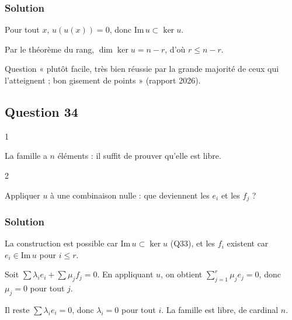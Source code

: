 \documentclass[11pt,a4paper]{article}
\newcommand{\equationajustee}[1]{%
  \sbox{\boiteequation}{$\displaystyle #1$}%
  \ifdim\wd\boiteequation>\linewidth
    \[\resizebox{\linewidth}{!}{\usebox{\boiteequation}}\]%
  \else
    \[#1\]%
  \fi}
\begin{document}
\hypertarget{solution-32}{%
\subsubsection{Solution}\label{solution-32}}

Pour tout \(x\), \(u(u(x))=0\), donc \(\mathrm{Im}\,u\subset\ker u\).

Par le théorème du rang, \(\dim\ker u=n-r\), d'où \(r\le n-r\).

\equationajustee{\boxed{\mathrm{Im}\,u\subset\ker u\ \text{ et }\ r\le n-r.}}

\begin{jury}

Question « plutôt facile, très bien réussie par la grande majorité de ceux qui l'atteignent ; bon gisement de points » (rapport 2026).

\end{jury}

\hypertarget{question-34}{%
\subsection{Question 34}\label{question-34}}

\begin{indication}{1}

La famille a \(n\) éléments : il suffit de prouver qu'elle est libre.

\end{indication}

\begin{indication}{2}

Appliquer \(u\) à une combinaison nulle : que deviennent les \(e_i\) et les \(f_j\) ?

\end{indication}

\hypertarget{solution-33}{%
\subsubsection{Solution}\label{solution-33}}

La construction est possible car \(\mathrm{Im}\,u\subset\ker u\) (Q33), et les \(f_i\) existent car \(e_i\in\mathrm{Im}\,u\) pour \(i\le r\).

Soit \(\sum\lambda_ie_i+\sum\mu_jf_j=0\). En appliquant \(u\), on obtient \(\sum_{j=1}^r\mu_je_j=0\), donc \(\mu_j=0\) pour tout \(j\).

Il reste \(\sum\lambda_ie_i=0\), donc \(\lambda_i=0\) pour tout \(i\). La famille est libre, de cardinal \(n\).
\end{document}
